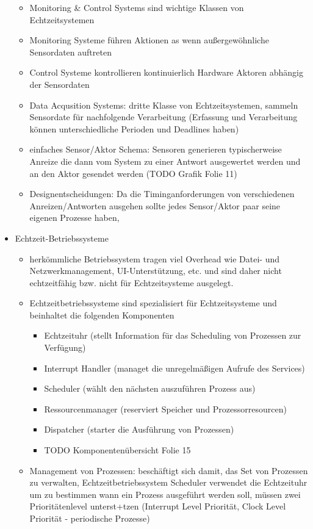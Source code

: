 \documentclass[paper=a4, fontsize=11pt]{scrartcl} %
\numberwithin{equation}{section} %
\numberwithin{figure}{section} %
\numberwithin{table}{section} %
\begin{document}
\begin{itemize}
  \begin{itemize}
    \item Monitoring \& Control Systems sind wichtige Klassen von Echtzeitsystemen
    \item Monitoring Systeme führen Aktionen as wenn außergewöhnliche Sensordaten auftreten
    \item Control Systeme kontrollieren kontinuierlich Hardware Aktoren abhängig der Sensordaten
    \item Data Acqusition Systems: dritte Klasse von Echtzeitsystemen, sammeln Sensordate für nachfolgende Verarbeitung (Erfassung und Verarbeitung können unterschiedliche Perioden und Deadlines haben)
    \item einfaches Sensor/Aktor Schema: Sensoren generieren typischerweise Anreize die dann vom System zu einer Antwort ausgewertet werden und an den Aktor gesendet werden (TODO Grafik Folie 11)
    \item Designentscheidungen: Da die Timinganforderungen von verschiedenen Anreizen/Antworten ausgehen sollte jedes Sensor/Aktor paar seine eigenen Prozesse haben,
  \end{itemize}
  \item Echtzeit-Betriebssysteme
  \begin{itemize}
    \item herkömmliche Betriebssystem tragen viel Overhead wie Datei- und Netzwerkmanagement, UI-Unterstützung, etc. und sind daher nicht echtzeitfähig bzw. nicht für Echtzeitsysteme ausgelegt.
    \item Echtzeitbetriebssysteme sind spezialisiert für Echtzeitsysteme und beinhaltet die folgenden Komponenten
    \begin{itemize}
      \item Echtzeituhr (stellt Information für das Scheduling von Prozessen zur Verfügung)
      \item Interrupt Handler (managet die unregelmäßigen Aufrufe des Services)
      \item Scheduler (wählt den nächsten auszuführen Prozess aus)
      \item Ressourcenmanager (reserviert Speicher und Prozessorresourcen)
      \item Dispatcher (starter die Ausführung von Prozessen)
      \item TODO Komponentenübersicht Folie 15
    \end{itemize}
    \item Management von Prozessen: beschäftigt sich damit, das Set von Prozessen zu verwalten, Echtzeitbetriebssystem Scheduler verwendet die Echtzeituhr um zu bestimmen wann ein Prozess ausgeführt werden soll, müssen zwei Prioritätenlevel unterst+tzen (Interrupt Level Priorität, Clock Level Priorität - periodische Prozesse)

\end{itemize}
\end{itemize}
\end{document}
